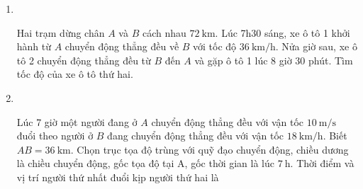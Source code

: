 \begin{enumerate}[label=\bfseries Câu \arabic*:,leftmargin=1.5cm]
\item {}\\
{Hai trạm dừng chân $A$ và $B$ cách nhau $\SI{72}{\kilo\meter}$. Lúc 7h30 sáng, xe ô tô 1 khởi hành từ $A$ chuyển động thẳng đều về $B$ với tốc độ $\SI{36}{\kilo\meter/\hour}$. Nửa giờ sau, xe ô tô 2 chuyển động thẳng đều từ $B$ đến $A$ và gặp ô tô 1 lúc 8 giờ 30 phút. Tìm tốc độ của xe ô tô thứ hai.
	\begin{mcq}(4)
		\item $v_2=\SI{70}{\kilo\meter/\hour}$.
		\item $v_2=\SI{72}{\kilo\meter/\hour}$.
		\item$v_2=\SI{73}{\kilo\meter/\hour}$.
		\item $v_2=\SI{74}{\kilo\meter/\hour}$.
	\end{mcq}

}

\item {}\\
{Lúc 7 giờ một người đang ở $A$ chuyển động thẳng đều với vận tốc $\SI{10}{\meter/\second}$ đuổi theo người ở $B$ đang chuyển động thẳng đều với vận tốc $\SI{18}{\kilo\meter/\hour}$. Biết $AB =\SI{36}{\kilo\meter}$. Chọn trục tọa độ trùng với quỹ đạo chuyển động, chiều dương là chiều chuyển động, gốc tọa độ tại A, gốc thời gian là lúc $\SI{7}{\hour}$. Thời điểm và vị trí người thứ nhất đuổi kịp người thứ hai là
}


\end{enumerate}
